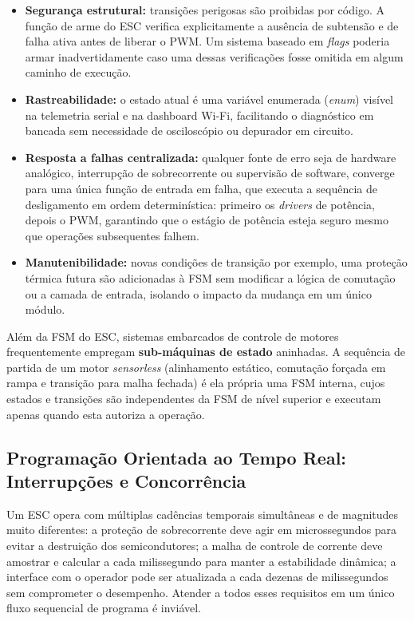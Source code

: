 \begin{itemize}
    \item \textbf{Segurança estrutural:} transições perigosas são proibidas por código. A função de arme do ESC verifica explicitamente a ausência de subtensão e de falha ativa antes de liberar o PWM. Um sistema baseado em \textit{flags} poderia armar inadvertidamente caso uma dessas verificações fosse omitida em algum caminho de execução.
    \item \textbf{Rastreabilidade:} o estado atual é uma variável enumerada (\textit{enum}) visível na telemetria serial e na dashboard Wi-Fi, facilitando o diagnóstico em bancada sem necessidade de osciloscópio ou depurador em circuito.
    \item \textbf{Resposta a falhas centralizada:} qualquer fonte de erro seja de hardware analógico, interrupção de sobrecorrente ou supervisão de software, converge para uma única função de entrada em falha, que executa a sequência de desligamento em ordem determinística: primeiro os \textit{drivers} de potência, depois o PWM, garantindo que o estágio de potência esteja seguro mesmo que operações subsequentes falhem.
    \item \textbf{Manutenibilidade:} novas condições de transição por exemplo, uma proteção térmica futura são adicionadas à FSM sem modificar a lógica de comutação ou a camada de entrada, isolando o impacto da mudança em um único módulo.
\end{itemize}

Além da FSM do ESC, sistemas embarcados de controle de motores frequentemente empregam \textbf{sub-máquinas de estado} aninhadas. A sequência de partida de um motor \textit{sensorless} (alinhamento estático, comutação forçada em rampa e transição para malha fechada) é ela própria uma FSM interna, cujos estados e transições são independentes da FSM de nível superior e executam apenas quando esta autoriza a operação.

\subsection{Programação Orientada ao Tempo Real: Interrupções e Concorrência}

Um ESC opera com múltiplas cadências temporais simultâneas e de magnitudes muito diferentes: a proteção de sobrecorrente deve agir em microssegundos para evitar a destruição dos semicondutores; a malha de controle de corrente deve amostrar e calcular a cada milissegundo para manter a estabilidade dinâmica; a interface com o operador pode ser atualizada a cada dezenas de milissegundos sem comprometer o desempenho. Atender a todos esses requisitos em um único fluxo sequencial de programa é inviável.

